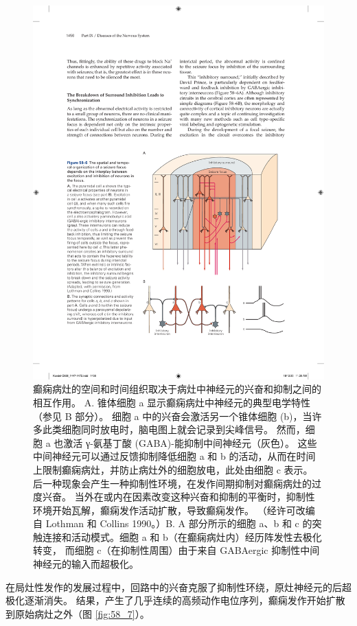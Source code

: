 \begin{figure}[htbp]
	\centering
	\includegraphics[width=0.7\linewidth]{chap58/fig_58_6}
	\caption{癫痫病灶的空间和时间组织取决于病灶中神经元的兴奋和抑制之间的相互作用。 A. 锥体细胞 a 显示癫痫病灶中神经元的典型电学特性（参见 B 部分）。 细胞 a 中的兴奋会激活另一个锥体细胞 (b)，当许多此类细胞同时放电时，脑电图上就会记录到尖峰信号。 然而，细胞 a 也激活 γ-氨基丁酸 (GABA)-能抑制中间神经元（灰色）。 这些中间神经元可以通过反馈抑制降低细胞 a 和 b 的活动，从而在时间上限制癫痫病灶，并防止病灶外的细胞放电，此处由细胞 c 表示。 后一种现象会产生一种抑制性环境，在发作间期抑制对癫痫病灶的过度兴奋。 当外在或内在因素改变这种兴奋和抑制的平衡时，抑制性环境开始瓦解，癫痫发作活动扩散，导致癫痫发作。 （经许可改编自 Lothman 和 Collins 1990。）B. A 部分所示的细胞 a、b 和 c 的突触连接和活动模式。细胞 a 和 b（在癫痫病灶内）经历阵发性去极化转变， 而细胞 c（在抑制性周围）由于来自 GABAergic 抑制性中间神经元的输入而超极化。}
	\label{fig:58_6}
\end{figure}

在局灶性发作的发展过程中，回路中的兴奋克服了抑制性环绕，原灶神经元的后超极化逐渐消失。 结果，产生了几乎连续的高频动作电位序列，癫痫发作开始扩散到原始病灶之外（图 \ref{fig:58_7}）。

